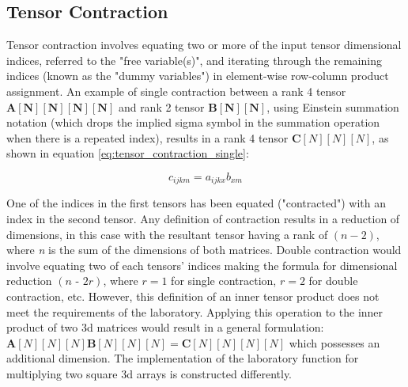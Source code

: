 \documentclass[10 pt, conference]{cssconf}
\begin{document}
\subsection{Tensor Contraction}
Tensor contraction involves equating two or more of the input tensor dimensional indices, referred to the "free variable(s)", and iterating through the remaining indices (known as the "dummy variables") in element-wise row-column product assignment. An example of single contraction between a rank 4 tensor $\mathbf{A[N][N][N][N]}$ and rank 2 tensor $\mathbf{B[N][N]}$, using Einstein summation notation (which drops the implied sigma symbol in the summation operation when there is a repeated index), results in a rank 4 tensor $\mathbf{C}[N][N][N]$, as shown in equation \ref{eq:tensor_contraction_single}:

\begin{equation}\label{eq:tensor_contraction_single}
    c_{ijkm} \mathrel{{=}} a_{ijkx}b_{xm}
\end{equation}

One of the indices in the first tensors has been equated ("contracted") with an index in the second tensor. Any definition of contraction results in a reduction of dimensions, in this case with the resultant tensor having a rank of $(\textit{n}-2)$, where \textit{n} is the sum of the dimensions of both matrices.  Double contraction would involve equating two of each tensors' indices making the formula for dimensional reduction $(\textit{n - 2r})$, where $r=1$ for single contraction, $r=2$ for double contraction, etc. However, this definition of an inner tensor product does not meet the requirements of the laboratory. Applying this operation to the inner product of two 3d matrices would result in a general formulation: $\mathbf{A}[N][N][N]\mathbf{B}[N][N][N]=\mathbf{C}[N][N][N][N]$ which possesses an additional dimension. The implementation of the laboratory function for multiplying two square 3d arrays is constructed differently.
\end{document}
